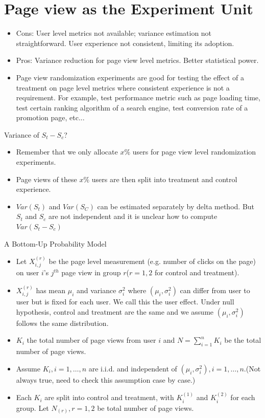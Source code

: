 \documentclass[xcolor=x11names,table]{beamer}
\begin{document}
\section{Page view as the Experiment Unit}
\begin{frame}
\begin{itemize}
\item Cons: User level metrics not available; variance estimation not straightforward. User experience not consistent, limiting its adoption. 
\item Pros: Variance reduction for page view level metrics. Better statistical power. 
\item Page view randomization experiments are good for testing the effect of a treatment on page level metrics where consistent experience is not a requirement. For example, test performance metric such as page loading time, test certain ranking algorithm of a search engine, test conversion rate of a promotion page, etc...
\end{itemize}
\end{frame}

\begin{frame}{Variance of $S_t-S_c$?} 
\begin{itemize}
\item Remember that we only allocate $x\%$ users for page view level randomization experiments. 
\item Page views of these $x\%$ users are then split into treatment and control experience.
\item $Var(S_t)$ and $Var(S_C)$ can be estimated separately by delta method. But $S_t$ and $S_c$ are not independent and it is unclear how to compute $Var(S_t-S_c)$
\end{itemize}
\end{frame}


\begin{frame}{A Bottom-Up Probability Model}
\begin{itemize}
\item  Let $X_{i,j}^{(r)}$ be the page level measurement (e.g. number of clicks on the page) on user $i$'s $j^{th}$ page view in group $r$($r=1,2$ for control and treatment).
\item $X_{i,j}^{(r)}$  has mean $\mu_i$ and variance $\sigma_i^2$ where $(\mu_i, \sigma_i^2)$ can differ from user to user but is fixed for each user. We call this the user effect. Under null hypothesis, control and treatment are the same and we assume $(\mu_i, \sigma_i^2)$ follows the same distribution.
\item $K_i$ the total number of page views from user $i$ and $N = \sum_{i=1}^n K_i$ be the total number of page views.
\item Assume $K_i,i=1,\dots,n$ are i.i.d. and independent of $(\mu_i,\sigma_i^2),i=1,\dots,n$.(Not always true, need to check this assumption case by case.) 
\item Each $K_i$ are split into control and treatment, with $K_i^{(1)}$ and $K_i^{(2)}$ for each group. Let $N_{(r)}, r=1,2$ be total number of page views. 
\end{itemize}
\end{frame}
\end{document}
